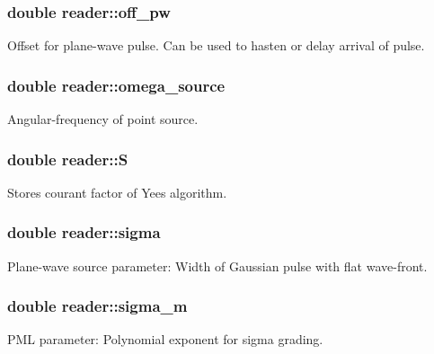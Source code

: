 \subsubsection[{\texorpdfstring{off\+\_\+pw}{off_pw}}]{\setlength{\rightskip}{0pt plus 5cm}double reader\+::off\+\_\+pw}\hypertarget{classreader_aa7745d62b0cc804028efbbf47e9bb60a}{}\label{classreader_aa7745d62b0cc804028efbbf47e9bb60a}
Offset for plane-\/wave pulse. Can be used to hasten or delay arrival of pulse. 
\subsubsection[{\texorpdfstring{omega\+\_\+source}{omega_source}}]{\setlength{\rightskip}{0pt plus 5cm}double reader\+::omega\+\_\+source}\hypertarget{classreader_abb9e0914f6536f966d697075963eac27}{}\label{classreader_abb9e0914f6536f966d697075963eac27}
Angular-\/frequency of point source. 
\subsubsection[{\texorpdfstring{S}{S}}]{\setlength{\rightskip}{0pt plus 5cm}double reader\+::S}\hypertarget{classreader_a3a22ddf8074dc65b8f1908bab38c2ea3}{}\label{classreader_a3a22ddf8074dc65b8f1908bab38c2ea3}
Stores courant factor of Yee\textquotesingle{}s algorithm. 
\subsubsection[{\texorpdfstring{sigma}{sigma}}]{\setlength{\rightskip}{0pt plus 5cm}double reader\+::sigma}\hypertarget{classreader_ab2abefbaf493aa9fde3c5d8d67ceb1d9}{}\label{classreader_ab2abefbaf493aa9fde3c5d8d67ceb1d9}
Plane-\/wave source parameter\+: Width of Gaussian pulse with flat wave-\/front. 
\subsubsection[{\texorpdfstring{sigma\+\_\+m}{sigma_m}}]{\setlength{\rightskip}{0pt plus 5cm}double reader\+::sigma\+\_\+m}\hypertarget{classreader_ac0696a966464fa2b5a02591578a7c677}{}\label{classreader_ac0696a966464fa2b5a02591578a7c677}
P\+ML parameter\+: Polynomial exponent for sigma grading. 
